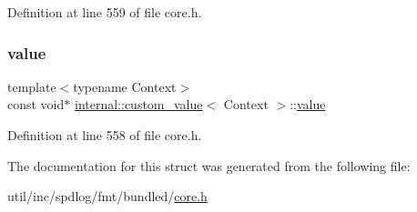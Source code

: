 Definition at line 559 of file core.\+h.

\mbox{\label{structinternal_1_1custom__value_ae709a1d791335ff50d6f3ac36bd57a34}} 
\subsubsection{\texorpdfstring{value}{value}}
{\footnotesize\ttfamily template$<$typename Context$>$ \\
const void$\ast$ \hyperlink{structinternal_1_1custom__value}{internal\+::custom\+\_\+value}$<$ Context $>$\+::\hyperlink{classinternal_1_1value}{value}}



Definition at line 558 of file core.\+h.



The documentation for this struct was generated from the following file\+:\begin{DoxyCompactItemize}
\item 
util/inc/spdlog/fmt/bundled/\hyperlink{core_8h}{core.\+h}\end{DoxyCompactItemize}
